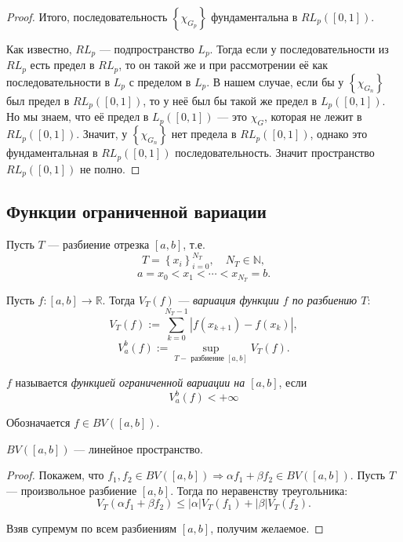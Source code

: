 \begin{proof}
    Итого, последовательность $\left\{\chi_{G_p}\right\}$ фундаментальна в $R L_p([0,1])$.

    Как известно, $R L_p$ — подпространство $L_p$. Тогда если у последовательности из $R L_p$ есть предел в $R L_p$, то он такой же и при рассмотрении её как последовательности в $L_p$ с пределом в $L_p$. В нашем случае, если бы у $\left\{\chi_{G_n}\right\}$ был предел в $R L_p([0,1])$, то у неё был бы такой же предел в $L_p([0,1])$. Но мы знаем, что её предел в $L_p([0,1])$ — это $\chi_G$, которая не лежит в $R L_p([0,1])$. Значит, у $\left\{\chi_{G_n}\right\}$ нет предела в $R L_p([0,1])$, однако это фундаментальная в $R L_p([0,1])$ последовательность. Значит пространство $R L_p([0,1])$ не полно.
\end{proof} 


\subsection{Функции ограниченной вариации}
\begin{definition}
    Пусть $T$ — разбиение отрезка $[a, b]$, т.е.
    $$T=\left\{x_i\right\}_{i=0}^{N_T}, \quad N_T \in \mathbb{N},$$
    $$a=x_0<x_1<\cdots<x_{N_T}=b.$$
    
    Пусть $f:[a, b] \rightarrow \mathbb{R}$. Тогда $V_T(f)$ — \textit{вариация функции $f$ по разбиению $T$}:
    $$V_T(f) :=\sum_{k=0}^{N_T-1}\left|f\left(x_{k+1}\right)-f\left(x_k\right)\right|,$$
    $$V_a^b(f) :=\sup _{T-\text { разбиение }[a, b]} V_T(f).$$
\end{definition} 

\begin{definition}
    $f$ называется \textit{функцией ограниченной вариации на $[a, b]$}, если
    $$V_a^b(f)<+\infty$$

    Обозначается $f \in B V([a, b])$.
\end{definition} 

\begin{theorem}
    $BV ([a,b])$ — линейное пространство.
\end{theorem} 
\begin{proof}
    Покажем, что $f_1, f_2 \in B V([a, b]) \Longrightarrow \alpha f_1+\beta f_2 \in B V([a, b])$. Пусть $T$ — произвольное разбиение $[a, b]$. Тогда по неравенству треугольника:
    $$V_T\left(\alpha f_1+\beta f_2\right) \leqslant|\alpha| V_T\left(f_1\right)+|\beta| V_T\left(f_2\right).$$

    Взяв супремум по всем разбиениям $[a,b]$, получим желаемое.
\end{proof} 

